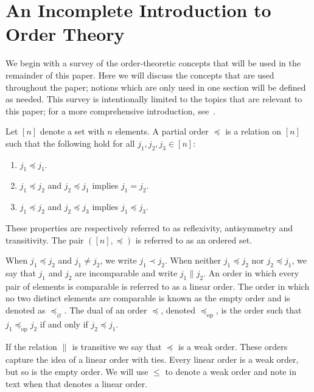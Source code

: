 \documentclass[12pt]{article}
\newcommand{\dual}[1]{#1_{\operatorname{op}}}
\newcommand{\incomp}[1][]{\|_{#1}}
\newcommand{\eord}{{\preceq_{\varnothing}}}
\numberwithin{theorem}{section}
\begin{document}
\section{An Incomplete Introduction to Order Theory}
\label{sec_bkgd}

We begin with a survey of the order-theoretic concepts that will be used in the remainder of this paper.  Here we will discuss the concepts that are used throughout the paper; notions which are only used in one section will be defined as needed.  This survey is intentionally limited to the topics that are relevant to this paper; for a more comprehensive introduction, see~\cite{schroder2016posetBook}.

Let $[n]$ denote a set with $n$ elements.  A partial order $\preceq$ is a relation on $[n]$ such that the following hold for all $j_1, j_2, j_3 \in [n]$:

\begin{enumerate}

\item $j_1 \preceq j_1$.

\item $j_1 \preceq j_2$ and $j_2 \preceq j_1$ implies $j_1 = j_2$.

\item $j_1 \preceq j_2$ and $j_2 \preceq j_3$ implies $j_1 \preceq j_3$.

\end{enumerate}

\noindent
These properties are respectively referred to as reflexivity, antisymmetry and transitivity.  The pair $([n], \preceq)$ is referred to as an ordered set.

When $j_1 \preceq j_2$ and $j_1 \neq j_2$, we write $j_1 \prec j_2$.  When neither $j_1 \preceq j_2$ nor $j_2 \preceq j_1$, we say that $j_1$ and $j_2$ are incomparable and write $j_1 \incomp j_2$.  An order in which every pair of elements is comparable is referred to as a linear order.  The order in which no two distinct elements are comparable is known as the empty order and is denoted as $\eord$.  
The dual of an order $\preceq$, denoted $\dual{\preceq}$, is the order such that $j_1 \dual{\preceq} j_2$ if and only if $j_2 \preceq j_1$.

If the relation $\incomp$ is transitive we say that $\preceq$ is a weak order.  These orders capture the idea of a linear order with ties.  Every linear order is a weak order, but so is the empty order.  We will use $\leqslant$ to denote a weak order and note in text when that denotes a linear order.
\end{document}
